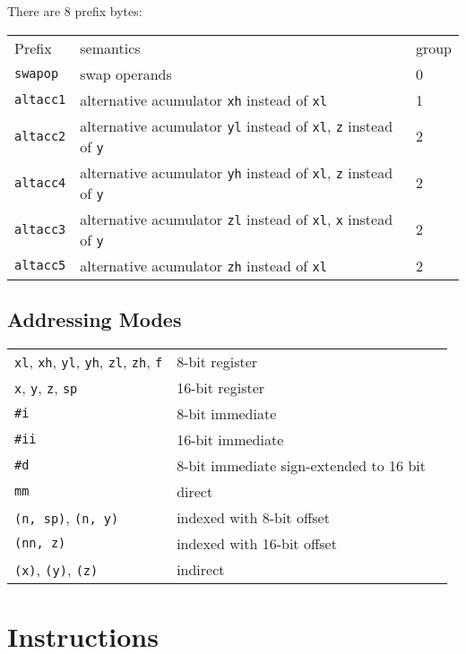 \documentclass{book}
\begin{document}
There are 8 prefix bytes:

\begin{tabular}{l l l}
Prefix & semantics & group \\
\texttt{swapop} & swap operands & 0 \\
\texttt{altacc1} & alternative acumulator \texttt{xh} instead of \texttt{xl} & 1 \\
\texttt{altacc2} & alternative acumulator \texttt{yl} instead of \texttt{xl}, \texttt{z} instead of \texttt{y} & 2 \\
\texttt{altacc4} & alternative acumulator \texttt{yh} instead of \texttt{xl}, \texttt{z} instead of \texttt{y} & 2 \\
\texttt{altacc3} & alternative acumulator \texttt{zl} instead of \texttt{xl}, \texttt{x} instead of \texttt{y} & 2 \\
\texttt{altacc5} & alternative acumulator \texttt{zh} instead of \texttt{xl} & 2
\end{tabular}

\section{Addressing Modes}

\begin{tabular}{l l l}
\texttt{xl}, \texttt{xh}, \texttt{yl}, \texttt{yh}, \texttt{zl}, \texttt{zh}, \texttt{f} & 8-bit register \\
\texttt{x}, \texttt{y}, \texttt{z}, \texttt{sp} & 16-bit register \\
\texttt{\#i} & 8-bit immediate \\
\texttt{\#ii} & 16-bit immediate \\
\texttt{\#d} & 8-bit immediate sign-extended to 16 bit \\
\texttt{mm} & direct \\
\texttt{(n, sp)}, \texttt{(n, y)} & indexed with 8-bit offset \\
\texttt{(nn, z)} & indexed with 16-bit offset \\
\texttt{(x)}, \texttt{(y)}, \texttt{(z)} & indirect
\end{tabular}


\chapter{Instructions}
\end{document}
